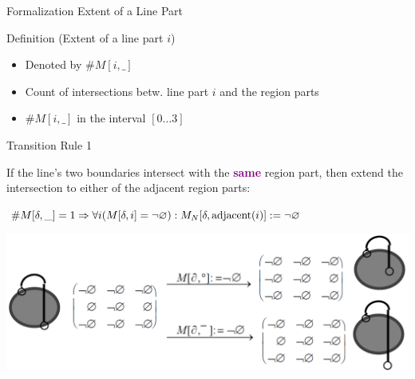 	\begin{frame}{Formalization Extent of a Line Part}
		\begin{block}{Definition (Extent of a line part $i$)}
			\begin{itemize}
				\item Denoted by $\#M[i, \_]$
				\item Count of intersections betw. line part $i$ and the region parts
				\item $\#M[i, \_]$ in the interval $[0\dots 3]$
			\end{itemize}
		\end{block}
	\end{frame}

	
	\begin{frame}{Transition Rule 1}
		\begin{block}{}
			If the line's two boundaries intersect with the \textcolor{purple}{\textbf{same}} region part, then extend the intersection to either of the adjacent region parts:
		\end{block}
		\begin{block}{}
			\centering $ \#M[\delta, \_] = 1 \Rightarrow
			\forall i (M[\delta, i] = \mbox{$\neg\varnothing$}):
			M_{N}[\delta, \text{adjacent}(i)] := \mbox{$\neg\varnothing$} $
		\end{block}
		\begin{block}{}
			\includegraphics[width=\textwidth]{images/smooth_transitions_example_a.png}
		\end{block}
	\end{frame}

	
